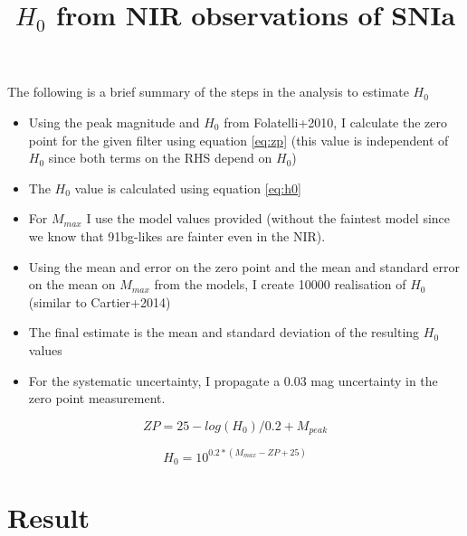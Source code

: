 \documentclass{article}
\begin{document}
\title{$H_0$ from NIR observations of SNIa}
\maketitle
The following is a brief summary of the steps in the analysis to estimate $H_0$

\begin{itemize}

\item Using the peak magnitude and $H_0$ from Folatelli+2010, I calculate the zero point for the given filter using equation \ref{eq:zp} (this value is independent of $H_0$ since both terms on the RHS depend on $H_0$)

\item The $H_0$ value is calculated using equation \ref{eq:h0}

\item For $M_{max}$ I use the model values provided (without the faintest model since we know that 91bg-likes are fainter even in the NIR). 

\item Using the mean and error on the zero point and the mean and standard error on the mean on $M_{max}$ from the models, I create 10000 realisation of $H_0$ (similar to Cartier+2014)

\item The final estimate is the mean and standard deviation of the resulting $H_0$ values

\item For the systematic uncertainty, I propagate a 0.03 mag uncertainty in the zero point measurement. 

\end{itemize}


\begin{equation}
\label{eq:zp}
ZP= 25 - log(H_0)/0.2 + M_{peak} 
\end{equation}



\begin{equation}
\label{eq:h0}
H_0 = 10^{0.2*(M_{max}-ZP+25)}
\end{equation}

\section{Result}

\end{document}
